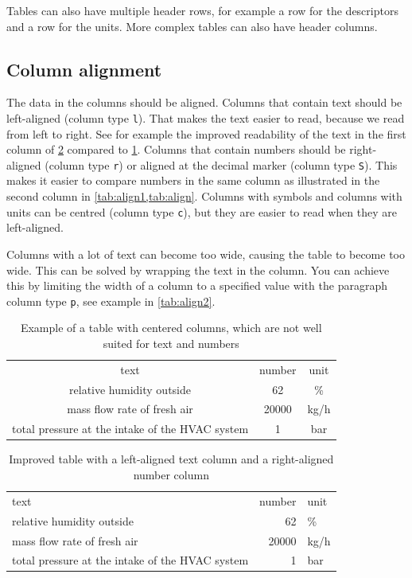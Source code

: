 Tables can also have multiple header rows, for example a row for the descriptors and a row for the units. More complex tables can also have header columns. 

\subsection{Column alignment}
The data in the columns should be aligned. Columns that contain text should be left-aligned (column type \texttt{l}). That makes the text easier to read, because we read from left to right. See for example the improved readability of the text in the first column of \cref{tab:align1} compared to \cref{tab:align}. Columns that contain numbers should be right-aligned (column type \texttt{r}) or aligned at the decimal marker (column type \texttt{S}). This makes it easier to compare numbers in the same column as illustrated in the second column in \cref{tab:align1,tab:align}. Columns with symbols and columns with units can be centred (column type \texttt{c}), but they are easier to read when they are left-aligned.

Columns with a lot of text can become too wide, causing the table to become too wide. This can be solved by wrapping the text in the column. You can achieve this by limiting the width of a column to a specified value with the paragraph column type \texttt{p}, see example in \cref{tab:align2}.

\begin{table}\centering
    \caption{Example of a table with centered columns, which are not well suited for text and
numbers}\label{tab:align}
    \begin{tabular}{ccc}  
        \toprule
        text        &  {number}  & unit \\[1ex]
        relative humidity outside       &   62    & \% \\
        mass flow rate of fresh air     &   \num{20000}     & \unit{kg/h}\\
        total pressure at the intake of the HVAC system                        &   1   & bar\\
        \bottomrule
    \end{tabular}
\end{table}

\begin{table}\centering
    \caption{Improved table with a left-aligned text column and a right-aligned number column}\label{tab:align1}
    \begin{tabular}{lrl}  
        \toprule
        text        &  {number}  & unit \\[1ex]
        relative humidity outside       &   62    & \% \\
        mass flow rate of fresh air     &   \num{20000}     & \unit{kg/h}\\
        total pressure at the intake of the HVAC system                       &   1   & bar\\
        \bottomrule
    \end{tabular}
\end{table}

